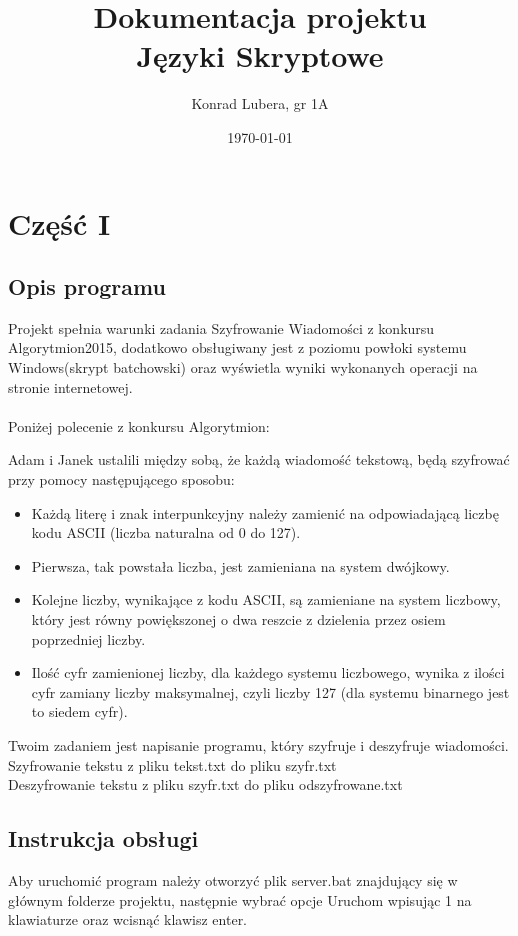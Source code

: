 \documentclass[12pt,a4paper]{article}
\begin{document}
	
	\title{Dokumentacja projektu\\ Języki Skryptowe}
	\author{Konrad Lubera, gr 1A}
	\date{\today}
	
	\maketitle
	\newpage
	\section*{Część I}
	\subsection*{Opis programu}
	 Projekt spełnia warunki zadania Szyfrowanie Wiadomości z konkursu Algorytmion2015, dodatkowo obsługiwany jest z poziomu powłoki systemu Windows(skrypt batchowski) oraz wyświetla wyniki wykonanych operacji na stronie internetowej. 
	 \\
	\\ Poniżej polecenie z konkursu Algorytmion:
	
	Adam i Janek ustalili między sobą, że każdą wiadomość tekstową, będą szyfrować przy pomocy następującego sposobu:
	\begin{itemize}
	\item   Każdą literę i znak interpunkcyjny należy zamienić na odpowiadającą liczbę kodu ASCII (liczba naturalna od 0 do 127).
	\item Pierwsza, tak powstała liczba, jest zamieniana na system dwójkowy.
	\item Kolejne liczby, wynikające z kodu ASCII, są zamieniane na system liczbowy, który jest równy powiększonej o dwa reszcie z dzielenia przez osiem poprzedniej liczby.
	\item  Ilość cyfr zamienionej liczby, dla każdego systemu liczbowego, wynika z ilości cyfr zamiany liczby maksymalnej, czyli liczby 127 (dla systemu binarnego jest to siedem cyfr). 
	\end{itemize}
	Twoim zadaniem jest napisanie programu, który szyfruje i deszyfruje wiadomości. \\
Szyfrowanie tekstu z pliku tekst.txt do pliku szyfr.txt \\ Deszyfrowanie tekstu z pliku szyfr.txt do pliku odszyfrowane.txt 

	\subsection*{Instrukcja obsługi}
	Aby uruchomić program należy otworzyć plik server.bat znajdujący się w głównym folderze projektu, następnie wybrać opcje Uruchom wpisując 1 na klawiaturze oraz wcisnąć klawisz enter.
		
\end{document}

